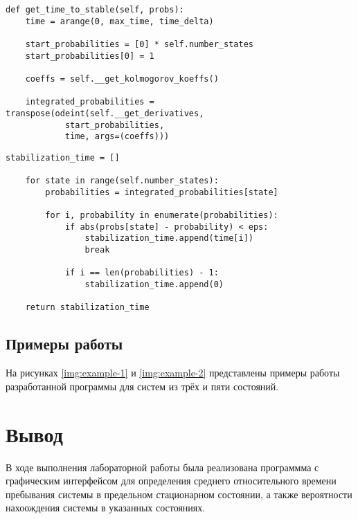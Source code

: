 \begin{center}
\captionsetup{justification=raggedright,singlelinecheck=off}
\begin{lstlisting}[label=lst:stab_time-1,caption=Реализация функции получения среднего относительного времени (часть 1)]
def get_time_to_stable(self, probs):
    time = arange(0, max_time, time_delta)

    start_probabilities = [0] * self.number_states
    start_probabilities[0] = 1

    coeffs = self.__get_kolmogorov_koeffs()

    integrated_probabilities = transpose(odeint(self.__get_derivatives,
            start_probabilities,
            time, args=(coeffs)))
\end{lstlisting}
\end{center}

\begin{center}
\captionsetup{justification=raggedright,singlelinecheck=off}
\begin{lstlisting}[label=lst:stab_time-2,caption=Реализация функции получения среднего относительного времени (часть 2)]
	stabilization_time = []

    for state in range(self.number_states):
        probabilities = integrated_probabilities[state]

        for i, probability in enumerate(probabilities):
            if abs(probs[state] - probability) < eps:
                stabilization_time.append(time[i])
                break

            if i == len(probabilities) - 1:
                stabilization_time.append(0)

    return stabilization_time
\end{lstlisting}
\end{center}

\subsection*{Примеры работы}

На рисунках \ref{img:example-1} и \ref{img:example-2} представлены примеры работы разработанной программы для систем из трёх и пяти состояний.


\section*{Вывод}

В ходе выполнения лабораторной работы была реализована программма с графическим интерфейсом для определения среднего относительного времени пребывания системы в предельном стационарном состоянии, а также вероятности нахоождения системы в указанных состояниях.


